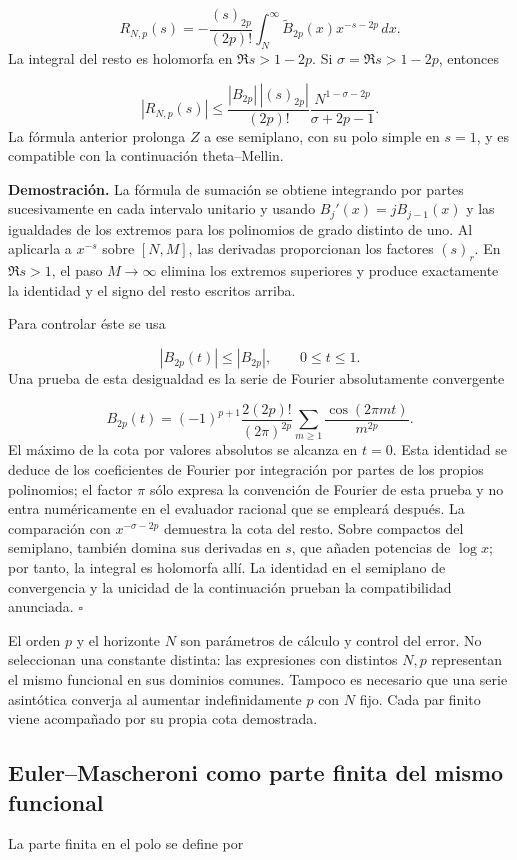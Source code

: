 \[
R_{N,p}(s)=-\frac{(s)_{2p}}{(2p)!}
\int_N^\infty\widetilde B_{2p}(x)x^{-s-2p}\,dx.
\]
La integral del resto es holomorfa en \(\Re s>1-2p\). Si \(\sigma=\Re s>1-2p\), entonces

\[
|R_{N,p}(s)|\leq
\frac{|B_{2p}|\,|(s)_{2p}|}{(2p)!}
\frac{N^{1-\sigma-2p}}{\sigma+2p-1}.
\]
La fórmula anterior prolonga \(Z\) a ese semiplano, con su polo simple en \(s=1\), y es compatible con la continuación theta–Mellin.

\textbf{Demostración.} La fórmula de sumación se obtiene integrando por partes sucesivamente en cada intervalo unitario y usando \(B_j'(x)=jB_{j-1}(x)\) y las igualdades de los extremos para los polinomios de grado distinto de uno. Al aplicarla a \(x^{-s}\) sobre \([N,M]\), las derivadas proporcionan los factores \((s)_r\). En \(\Re s>1\), el paso \(M\to\infty\) elimina los extremos superiores y produce exactamente la identidad y el signo del resto escritos arriba.

Para controlar éste se usa

\[
|B_{2p}(t)|\leq |B_{2p}|,\qquad 0\leq t\leq1.
\]
Una prueba de esta desigualdad es la serie de Fourier absolutamente convergente

\[
B_{2p}(t)=(-1)^{p+1}\frac{2(2p)!}{(2\pi)^{2p}}
\sum_{m\geq1}\frac{\cos(2\pi mt)}{m^{2p}}.
\]
El máximo de la cota por valores absolutos se alcanza en \(t=0\). Esta identidad se deduce de los coeficientes de Fourier por integración por partes de los propios polinomios; el factor \(\pi\) sólo expresa la convención de Fourier de esta prueba y no entra numéricamente en el evaluador racional que se empleará después. La comparación con \(x^{-\sigma-2p}\) demuestra la cota del resto. Sobre compactos del semiplano, también domina sus derivadas en \(s\), que añaden potencias de \(\log x\); por tanto, la integral es holomorfa allí. La identidad en el semiplano de convergencia y la unicidad de la continuación prueban la compatibilidad anunciada. \hfill\(\square\)

El orden \(p\) y el horizonte \(N\) son parámetros de cálculo y control del error. No seleccionan una constante distinta: las expresiones con distintos \(N,p\) representan el mismo funcional en sus dominios comunes. Tampoco es necesario que una serie asintótica converja al aumentar indefinidamente \(p\) con \(N\) fijo. Cada par finito viene acompañado por su propia cota demostrada.

\subsection{Euler–Mascheroni como parte finita del mismo funcional}
La parte finita en el polo se define por


